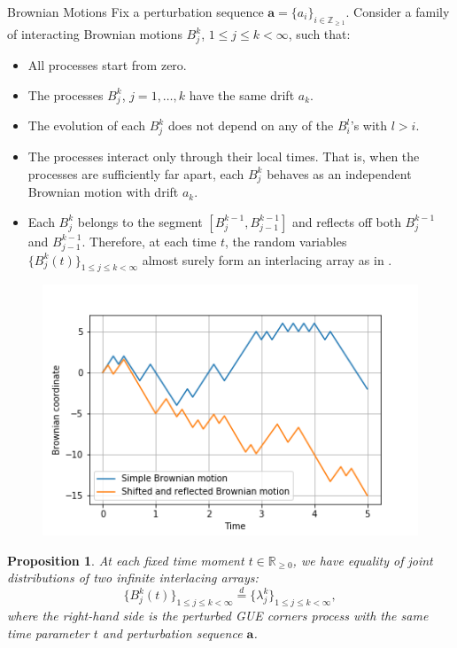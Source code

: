 \documentclass[english,final,t]{beamer}
\newtheorem{proposition}{Proposition}[section]
\begin{document}
\begin{frame}{}
\begin{columns}[t]
\begin{column}{.26\linewidth}
\begin{block}{Brownian Motions}
Fix a perturbation sequence $\mathbf{a}=\{a_i \}_{i\in \mathbb{Z}_{\ge1}}$.
Consider a family of interacting Brownian motions 
$B^k_j$, $1\le j\le k<\infty$, such that:
\begin{itemize}
	\item All processes start from zero.
	\item The processes $B^k_j$, $j=1,\ldots,k $
		have the same drift $a_k$.
	\item The evolution of each $B^k_j$
		does not depend on any of the $B^l_i$'s with $l>i$.
	\item The processes interact only through their local times.
		That is, when the processes are sufficiently far apart,
		each $B^k_j$ behaves as an independent Brownian motion 
		with drift $a_k$.
	\item Each $B^k_j$ belongs to the segment
		$[B^{k-1}_j,B^{k-1}_{j-1}]$
		and reflects off 
		both 
		$B^{k-1}_j$ and $B^{k-1}_{j-1}$.
		Therefore, at each time $t$, the 
		random variables
		$\{B^k_j(t)\}_{1\le j\le k<\infty}$ almost surely form
		an interlacing array as in .
\end{itemize}
\end{block}
\begin{figure}[bm]
	\centering
	\includegraphics[width=.9\textwidth]{reflected_bm.png}
	\label{fig:bm}
\end{figure}
\begin{proposition}
	\label{prop:connection_to_reflected_BM}
	At each fixed time moment $t\in \mathbb{R}_{\ge0}$, we have equality
	of joint distributions of two infinite interlacing arrays:
	\begin{equation*}
		\{B^k_j(t)\}_{1\le j\le k<\infty}
		\stackrel{d}{=}
		\{\lambda^k_j\}_{1\le j\le k<\infty},
	\end{equation*}
	where the right-hand side is the perturbed GUE
	corners process with the same time parameter $t$
	and perturbation sequence $\mathbf{a}$.
\end{proposition}


\end{column}
\end{columns}
\end{frame}
\end{document}
